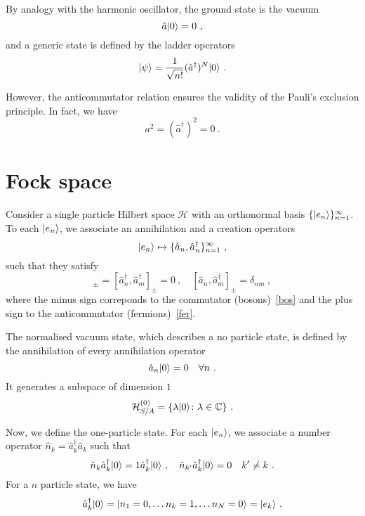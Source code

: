     By analogy with the harmonic oscillator, the ground state is the vacuum 
    \begin{equation*}
        \hat a \vert0\rangle = 0 ~,
    \end{equation*}
    and a generic state is defined by the ladder operators
    \begin{equation*}
        \vert\psi\rangle = \frac{1}{\sqrt{n!}} (\hat a^\dagger)^N \vert0\rangle ~.
    \end{equation*}

    However, the anticommutator relation ensures the validity of the Pauli's exclusion principle. In fact, we have 
    \begin{equation*}
        a^2 = (\hat a^\dagger)^2 = 0 ~.
    \end{equation*}

\section{Fock space}

    Consider a single particle Hilbert space $\mathcal H$ with an orthonormal basis $\{\vert e_n\rangle\}_{n=1}^\infty$. To each $\vert e_n\rangle$, we associate an annihilation and a creation operators 
    \begin{equation*}
        \vert e_n\rangle \mapsto \{\hat a_n, \hat a_n^\dagger \}_{n=1}^\infty ~,
    \end{equation*}
    such that they satisfy
    \begin{equation*}
        [\hat a_n, \hat a_m]_\pm = [\hat a_n^\dagger, \hat a_m^\dagger]_\pm = 0 ~, \quad [\hat a_n, \hat a_m^\dagger]_\pm = \delta_{nm} ~,
    \end{equation*}
    where the minus sign correponds to the commutator (bosons)~\eqref{bos} and the plus sign to the anticommutator (fermions)~\eqref{fer}. 

    The normalised vacuum state, which describes a no particle state, is defined by the annihilation of every annihilation operator
    \begin{equation*}
        \hat a_n \vert0\rangle = 0 \quad \forall n~.
    \end{equation*}
    It generates a subspace of dimension $1$ 
    \begin{equation}\label{vac}
        \mathcal H^{(0)}_{S/A} = \{\lambda \vert0\rangle \colon \lambda \in \mathbb C \} ~.
    \end{equation}

    Now, we define the one-particle state. For each $\vert e_n\rangle$, we associate a number operator $\hat n_k = \hat a_k^\dagger \hat a_k$ such that 
    \begin{equation*}
        \hat n_k \hat a_k^\dagger \vert0\rangle = 1 \hat a_k^\dagger \vert0\rangle ~, \quad \hat n_{k'} \hat a_k^\dagger \vert0\rangle = 0 \quad k' \neq k ~.
    \end{equation*}
    For a $n$ particle state, we have 
    \begin{equation*}
        \hat a_k^\dagger \vert0\rangle = \vert n_1=0, \ldots n_k=1, \ldots n_N=0\rangle = \vert e_k\rangle ~.
    \end{equation*}

